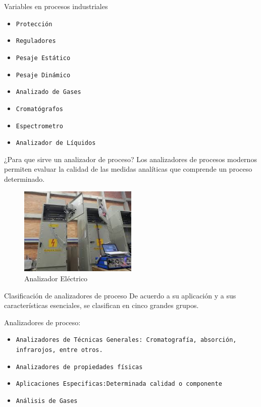 \documentclass[10pt]{beamer}
\begin{document}
{\begin{frame}{Variables en procesos industriales}{}
\begin{block}{}
\begin{itemize}
    \item {\tt Protección}
    \item {\tt Reguladores}
    \item {\tt Pesaje Estático}
    \item {\tt Pesaje Dinámico}
    \item {\tt Analizado de Gases}
    \item {\tt Cromatógrafos}
    \item {\tt Espectrometro}
    \item {\tt Analizador de Líquidos}
  	\end{itemize}
	\end{block}
	\end{frame}
	\begin{frame}{¿Para que sirve un analizador de proceso?}{}
Los analizadores de procesos modernos permiten evaluar la calidad de las medidas analíticas que comprende un proceso determinado.
\begin{figure}%
\includegraphics[width=0.5\textwidth]{figura_3.jpg} %
\caption{\label{fig:2}Analizador Eléctrico} %
\end{figure}
\end{frame}
\begin{frame}{Clasificación de analizadores de proceso}{}
De acuerdo a su aplicación y a sus características esenciales, se clasifican en cinco grandes grupos.  
\begin{block}{ }
Analizadores de proceso:
  \begin{itemize}
    \item {\tt Analizadores de Técnicas Generales: Cromatografía, absorción, infrarojos, entre otros.}
    \item {\tt Analizadores de propiedades físicas}
    \item {\tt Aplicaciones Especificas:Determinada calidad o componente}
    \item {\tt Análisis de Gases}

\end{itemize}
\end{block}
\end{frame}}
\end{document}
